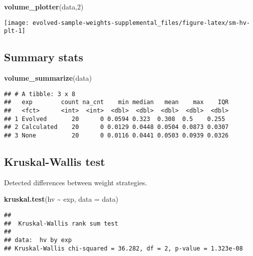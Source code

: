 \documentclass[
]{book}
\newenvironment{Shaded}{\begin{snugshade}}{\end{snugshade}}
\newcommand{\AttributeTok}[1]{\textcolor[rgb]{0.13,0.29,0.53}{#1}}
\newcommand{\DecValTok}[1]{\textcolor[rgb]{0.00,0.00,0.81}{#1}}
\newcommand{\FunctionTok}[1]{\textcolor[rgb]{0.13,0.29,0.53}{\textbf{#1}}}
\newcommand{\NormalTok}[1]{#1}
\newcommand{\SpecialCharTok}[1]{\textcolor[rgb]{0.81,0.36,0.00}{\textbf{#1}}}
\begin{document}
\begin{Shaded}
\begin{Highlighting}[]
\FunctionTok{volume\_plotter}\NormalTok{(data,}\DecValTok{2}\NormalTok{)}
\end{Highlighting}
\end{Shaded}

\texttt{[image: evolved-sample-weights-supplemental\_files/figure-latex/sm-hv-plt-1]}

\hypertarget{summary-stats-1}{%
\subsection{Summary stats}\label{summary-stats-1}}

\begin{Shaded}
\begin{Highlighting}[]
\FunctionTok{volume\_summarize}\NormalTok{(data)}
\end{Highlighting}
\end{Shaded}

\begin{verbatim}
## # A tibble: 3 x 8
##   exp        count na_cnt    min median   mean    max    IQR
##   <fct>      <int>  <int>  <dbl>  <dbl>  <dbl>  <dbl>  <dbl>
## 1 Evolved       20      0 0.0594 0.323  0.308  0.5    0.255 
## 2 Calculated    20      0 0.0129 0.0448 0.0504 0.0873 0.0307
## 3 None          20      0 0.0116 0.0441 0.0503 0.0939 0.0326
\end{verbatim}

\hypertarget{kruskal-wallis-test-1}{%
\subsection{Kruskal-Wallis test}\label{kruskal-wallis-test-1}}

Detected differences between weight strategies.

\begin{Shaded}
\begin{Highlighting}[]
\FunctionTok{kruskal.test}\NormalTok{(hv }\SpecialCharTok{\textasciitilde{}}\NormalTok{ exp, }\AttributeTok{data =}\NormalTok{ data)}
\end{Highlighting}
\end{Shaded}

\begin{verbatim}
## 
##  Kruskal-Wallis rank sum test
## 
## data:  hv by exp
## Kruskal-Wallis chi-squared = 36.282, df = 2, p-value = 1.323e-08
\end{verbatim}
\end{document}
